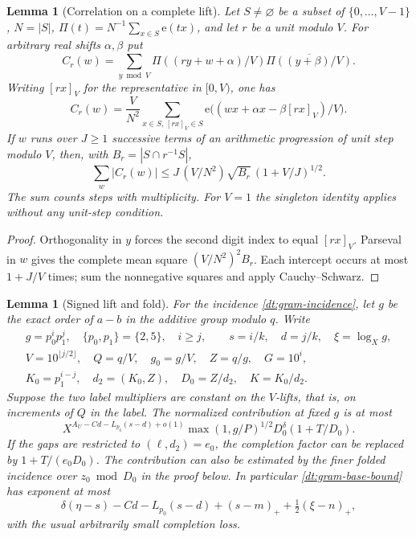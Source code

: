 \documentclass[11pt,a4paper]{article}
\theoremstyle{paperplain}
\newtheorem{lemma}[theorem]{Lemma}
\numberwithin{equation}{section}
\newcommand{\e}{\mathrm e}
\begin{document}
\begin{lemma}[Correlation on a complete lift]\label{dt:finite-signed-lift}
Let $S\ne\varnothing$ be a subset of $\{0,\ldots,V-1\}$,
$N=|S|$, $\Pi(t)=N^{-1}\sum_{x\in S}\e(tx)$, and let $r$ be a unit
modulo $V$. For arbitrary real shifts $\alpha,\beta$ put
\[
 C_r(w)=\sum_{y\bmod V}\Pi((ry+w+\alpha)/V)
                      \overline{\Pi((y+\beta)/V)}.
\]
Writing $[rx]_V$ for the representative in $[0,V)$, one has
\begin{equation}
 C_r(w)=\frac V{N^2}\sum_{x\in S,\,[rx]_V\in S}
       \e\big((wx+\alpha x-\beta[rx]_V)/V\big).
 \label{dt:gram-intercept-identity}
\end{equation}
If $w$ runs over $J\ge1$ successive terms of an arithmetic progression
of unit step modulo $V$, then, with $B_r=|S\cap r^{-1}S|$,
\[
 \sum_w |C_r(w)|\le J\,(V/N^2)\sqrt{B_r}\,(1+V/J)^{1/2}.
\]
The sum counts steps with multiplicity. For $V=1$ the singleton
identity applies without any unit-step condition.
\end{lemma}
\begin{proof}
Orthogonality in $y$ forces the second digit index to equal $[rx]_V$.
Parseval in $w$ gives the complete mean square $(V/N^2)^2B_r$.
Each intercept occurs at most $1+J/V$ times; sum the nonnegative
squares and apply Cauchy--Schwarz.
\end{proof}

\begin{lemma}[Signed lift and fold]\label{dt:gram-base}
For the incidence \eqref{dt:gram-incidence}, let \(g\) be the
exact order of \(a-b\) in the additive group modulo \(q\).
Write
\begin{equation}
 \begin{gathered}
 g=p_0^ip_1^j,\quad \{p_0,p_1\}=\{2,5\},\quad i\ge j,\qquad
 s=i/k,\quad d=j/k,\quad \xi=\log_X g,\\
 V=10^{\lfloor j/2\rfloor},\quad Q=q/V,\quad
 g_0=g/V,\quad Z=q/g,\quad G=10^i,\\
 K_0=p_1^{i-j},\quad d_2=(K_0,Z),\quad
 D_0=Z/d_2,\quad K=K_0/d_2.
 \end{gathered}
 \label{dt:gram-order}
\end{equation}
Suppose the two label multipliers are constant on the
\(V\)-lifts, that is, on increments of \(Q\) in the label.
The normalized contribution at fixed \(g\) is at most
\begin{equation}
 X^{A_U-Cd-L_{p_0}(s-d)+o(1)}
       \max(1,g/P)^{1/2}D_0^\delta(1+T/D_0).
 \label{dt:gram-base-bound}
\end{equation}
If the gaps are restricted to \((\ell,d_2)=e_0\), the
completion factor can be replaced by \(1+T/(e_0D_0)\).
The contribution can also be estimated by the finer folded
incidence over \(z_0\bmod D_0\) in the proof below.
In particular \eqref{dt:gram-base-bound} has exponent at most
\begin{equation}
 \delta(\eta-s)-Cd-L_{p_0}(s-d)+(s-m)_+
                                    +\tfrac12(\xi-n)_+,
 \label{dt:gram-base-exponent}
\end{equation}
with the usual arbitrarily small completion loss.
\end{lemma}
\end{document}

